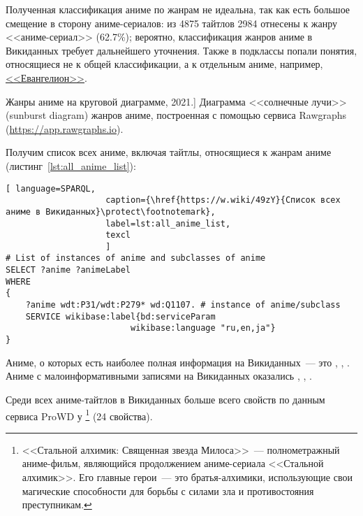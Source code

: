 Полученная классификация аниме по жанрам не идеальна, так как есть большое смещение в сторону аниме-сериалов: из \num{4875} тайтлов \num{2984} отнесены к жанру <<аниме-сериал>> (\num{62,7}\%); вероятно, классификация жанров аниме в Викиданных требует дальнейшего уточнения. Также в подклассы попали понятия, относящиеся не к общей классификации, а к отдельным аниме, например, \href{https://w.wiki/4L5p}{<<Евангелион>>}.

\begin{marginfigure}[0.0cm]
{
	\setlength{\fboxsep}{0pt}%
	\setlength{\fboxrule}{1pt}%
}
\caption
[Жанры аниме на круговой диаграмме, 2021.]
{
Диаграмма <<солнечные лучи>> (sunburst diagram) жанров аниме, построенная с помощью сервиса Rawgraphs (\href{https://app.rawgraphs.io}{https://app.rawgraphs.io}).\newline
}
\label{fig:anime_piechart}
\end{marginfigure}

Получим список всех аниме, включая тайтлы, относящиеся к жанрам аниме (листинг~\ref{lst:all_anime_list}):

\begin{lstlisting}[ language=SPARQL, 
                    caption={\href{https://w.wiki/49zY}{Список всех аниме в Викиданных}\protect\footnotemark},
                    label=lst:all_anime_list,
                    texcl 
                    ]
# List of instances of anime and subclasses of anime
SELECT ?anime ?animeLabel
WHERE
{
    ?anime wdt:P31/wdt:P279* wd:Q1107. # instance of anime/subclass
    SERVICE wikibase:label{bd:serviceParam
					     wikibase:language "ru,en,ja"}
}
\end{lstlisting}%

Аниме, о которых есть наиболее полная информация на Викиданных~--- это , , . Аниме с малоинформативными записями на Викиданных оказались , , .

Среди всех аниме-тайтлов в Викиданных больше всего свойств по данным сервиса ProWD\autocite{anime_prowd} у \footnote{<<Стальной алхимик: Священная звезда Милоса>>~--- полнометражный аниме-фильм, являющийся продолжением аниме-сериала <<Стальной алхимик>>. Его главные герои~--- это братья-алхимики, использующие свои магические способности для борьбы с силами зла и противостояния преступникам.} (\num{24} свойства).

